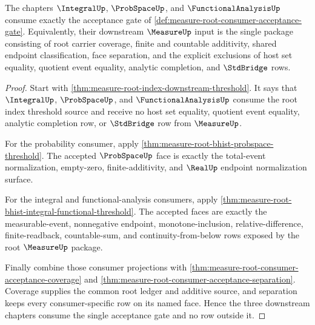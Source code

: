 \begin{theorem}
\label{thm:measure-root-consumer-acceptance-downstream-package}
The chapters $\IntegralUp$, $\ProbSpaceUp$, and $\FunctionalAnalysisUp$
consume exactly the acceptance gate of
\autoref{def:measure-root-consumer-acceptance-gate}. Equivalently, their
downstream $\MeasureUp$ input is the single package consisting of root carrier
coverage, finite and countable additivity, shared endpoint classification,
face separation, and the explicit exclusions of host set equality, quotient
event equality, analytic completion, and $\StdBridge$ rows.
\end{theorem}
\begin{proof}
Start with \autoref{thm:measure-root-index-downstream-threshold}. It says
that $\IntegralUp$, $\ProbSpaceUp$, and $\FunctionalAnalysisUp$ consume the
root index threshold source and receive no host set equality, quotient event
equality, analytic completion row, or $\StdBridge$ row from $\MeasureUp$.

For the probability consumer, apply
\autoref{thm:measure-root-bhist-probspace-threshold}. The accepted
$\ProbSpaceUp$ face is exactly the total-event normalization, empty-zero,
finite-additivity, and $\RealUp$ endpoint normalization surface.

For the integral and functional-analysis consumers, apply
\autoref{thm:measure-root-bhist-integral-functional-threshold}. The accepted
faces are exactly the measurable-event, nonnegative endpoint,
monotone-inclusion, relative-difference, finite-readback, countable-sum, and
continuity-from-below rows exposed by the root $\MeasureUp$ package.

Finally combine those consumer projections with
\autoref{thm:measure-root-consumer-acceptance-coverage} and
\autoref{thm:measure-root-consumer-acceptance-separation}. Coverage supplies
the common root ledger and additive source, and separation keeps every
consumer-specific row on its named face. Hence the three downstream chapters
consume the single acceptance gate and no row outside it.
\end{proof}
